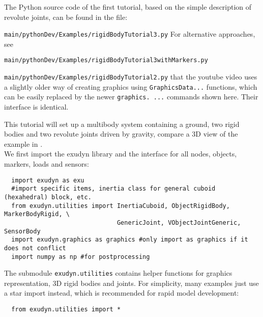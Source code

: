 \newpage
{}
The Python source code of the first tutorial, based on the simple description of revolute joints, can be found in the file:
\bi
  \item[] \texttt{main/pythonDev/Examples/rigidBodyTutorial3.py}
\ei
For alternative approaches, see
\bi
  \item[] \texttt{main/pythonDev/Examples/rigidBodyTutorial3withMarkers.py}
  \item[] \texttt{main/pythonDev/Examples/rigidBodyTutorial2.py}
\ei
{} that the youtube video uses a slightly older way of creating graphics using \texttt{GraphicsData...} functions, which
can be easily replaced by the newer \texttt{graphics. ...} commands shown here. Their interface is identical.

This tutorial will set up a multibody system containing a ground, two rigid bodies and two revolute joints driven by gravity, compare a 3D view of the example in .
%
%
%
%
\horizontalRuler\\
\noindent We first import the exudyn library and the interface for all nodes, objects, markers, loads and sensors:
\pythonstyle\begin{lstlisting}
  import exudyn as exu
  #import specific items, inertia class for general cuboid (hexahedral) block, etc.
  from exudyn.utilities import InertiaCuboid, ObjectRigidBody, MarkerBodyRigid, \
                               GenericJoint, VObjectJointGeneric, SensorBody
  import exudyn.graphics as graphics #only import as graphics if it does not conflict
  import numpy as np #for postprocessing
\end{lstlisting}
The submodule \texttt{exudyn.utilities} contains helper functions for graphics representation, 3D rigid bodies and joints.
For simplicity, many examples just use a star import instead, which is recommended for rapid model development:
\pythonstyle\begin{lstlisting}
  from exudyn.utilities import *
\end{lstlisting}


